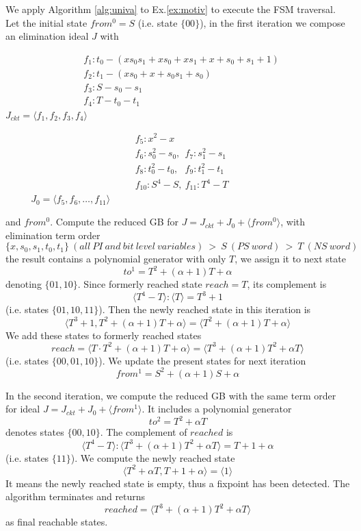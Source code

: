 \begin{example}
We apply Algorithm \ref{alg:univa} to Ex.\ref{ex:motiv} to execute the FSM traversal. Let the initial state
$from^0 = S$ (i.e. state $\{00\}$), in the first iteration we compose an elimination ideal $J$ with

\begin{minipage}[h]{0.4\textwidth}
\begin{align*}
&f_1: t_0- (xs_0s_1+xs_0+xs_1+x+s_0+s_1+1)\\
&f_2: t_1 - (xs_0+x+s_0s_1+s_0)\\
&f_3: S - s_0 - s_1\\
&f_4: T - t_0 - t_1
\end{align*}
$J_{ckt} = \langle f_1,f_2,f_3,f_4\rangle$
\end{minipage}
\begin{minipage}[h]{0.6\textwidth}
\begin{align*}
&f_5: x^2-x\\
&f_6: s_0^2-s_0, ~~f_7: s_1^2-s_1\\
&f_8: t_0^2-t_0, ~~~f_9: t_1^2-t_1\\
&f_{10}: S^4-S, ~f_{11}:T^4-T
\end{align*}
$\ \ \ \ \ \ \ \ \ \ \  \ J_0 = \langle f_5,f_6,\dots,f_{11}\rangle$
\end{minipage}

and $from^0$. Compute the reduced GB for $J = J_{ckt}+J_0+\langle from^0\rangle$,
with elimination term order
$$\{x,s_0,s_1,t_0,t_1\}~(all~PI~and~bit~level~variables)~>~S~(PS~word)~ >~ T~(NS~word)$$
the result contains
a polynomial generator with only $T$, we assign it to next state $$to^1 = T^2+(\alpha+1)T+\alpha$$ denoting
$\{01,10\}$. Since formerly reached state $reach = T$, its complement is $$\langle T^4-T\rangle:\langle T\rangle
= T^3+1$$ (i.e. states $\{01,10,11\}$). Then the newly reached state in this iteration is
$$\langle T^3+1, T^2+(\alpha+1)T+\alpha \rangle = \langle T^2+(\alpha+1)T+\alpha \rangle$$ We add these states
to formerly reached states $$reach = \langle T\cdot T^2+(\alpha+1)T+\alpha \rangle = \langle T^3+(\alpha+1)T^2+\alpha T\rangle$$
(i.e. states $\{00,01,10\}$). We update the present states for next iteration $$from^1 = S^2+(\alpha+1)S+\alpha$$

In the second iteration, we compute the reduced GB with the same term order for ideal $J = J_{ckt}+J_0+\langle from^1\rangle$.
It includes a polynomial generator $$to^2 = T^2+\alpha T$$ denotes states
$\{00,10\}$. The complement of $reached$ is $$\langle T^4-T\rangle:\langle T^3+(\alpha+1)T^2+\alpha T\rangle
= T + 1+\alpha$$ (i.e. states $\{11\}$). We compute the newly reached state 
$$\langle T^2+\alpha T, T+1+\alpha \rangle = \langle 1\rangle$$ 
It means the newly reached state is empty, thus a fixpoint has been detected. The algorithm terminates and returns
$$reached = \langle T^3+(\alpha+1)T^2+\alpha T\rangle$$ as final reachable states.


\end{example}
